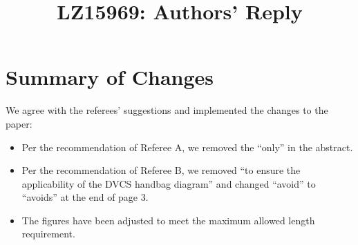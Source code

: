 \documentclass{article}
\title{LZ15969:  Authors' Reply}
\begin{document}
\maketitle

\section{Summary of Changes}
We agree with the referees' suggestions and implemented the changes to the paper:  

\begin{itemize}
   \item{ Per the recommendation of Referee A, we removed the ``only'' in the abstract.}
   \item{ Per the recommendation of Referee B, we removed ``to ensure the applicability of the DVCS handbag diagram'' and changed ``avoid'' to ``avoids'' at the end of page 3.}
   \item{ The figures have been adjusted to meet the maximum allowed length requirement.}   
\end{itemize}
\end{document}
